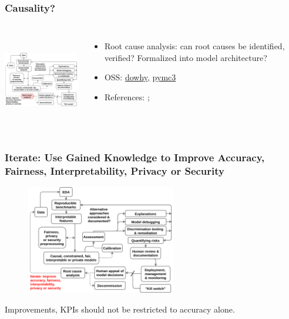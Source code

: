 \documentclass[11pt,
               aspectratio=169,
               hyperref={colorlinks}
               ]{beamer}
\begin{document}
			\begin{frame}
			
				\frametitle{Causality?}	
				
				\begin{columns}
		
					\centering
					\includegraphics[height=120pt]{../img/cause.png}
					
					\begin{itemize}
						\item Root cause analysis: can root causes be identified, verified? Formalized into model architecture? 
						\item OSS: \href{https://github.com/microsoft/dowhy}{dowhy}, \href{https://docs.pymc.io/}{pymc3}
						\item References: ; 
					\end{itemize}
					
				\end{columns}
				
			\end{frame}
	
			\begin{frame}	
	
				\frametitle{Iterate: Use Gained Knowledge to Improve Accuracy, Fairness, Interpretability, Privacy or Security}		
				
				\begin{figure}[htb]
					\begin{center}
						\includegraphics[height=135pt]{../img/iter.png}
						\label{fig:blueprint}
					\end{center}
				\end{figure}	
	
				\centering
				Improvements, KPIs should not be restricted to accuracy alone.
			
			\end{frame}
\end{document}
